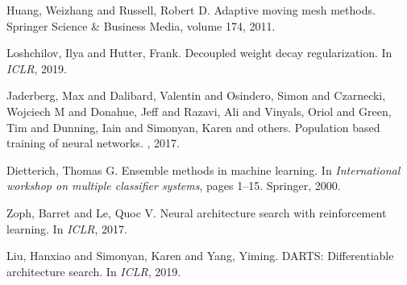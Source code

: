\documentclass[11pt,a4paper]{article}
\begin{document}
\begin{thebibliography}{15}
Huang, Weizhang and Russell, Robert D.
\newblock Adaptive moving mesh methods.
\newblock Springer Science \& Business Media, volume 174, 2011.

Loshchilov, Ilya and Hutter, Frank.
\newblock Decoupled weight decay regularization.
\newblock In {\em ICLR}, 2019.

Jaderberg, Max and Dalibard, Valentin and Osindero, Simon and Czarnecki, Wojciech M and Donahue, Jeff and Razavi, Ali and Vinyals, Oriol and Green, Tim and Dunning, Iain and Simonyan, Karen and others.
\newblock Population based training of neural networks.
, 2017.

Dietterich, Thomas G.
\newblock Ensemble methods in machine learning.
\newblock In {\em International workshop on multiple classifier systems}, pages 1--15. Springer, 2000.

Zoph, Barret and Le, Quoc V.
\newblock Neural architecture search with reinforcement learning.
\newblock In {\em ICLR}, 2017.

Liu, Hanxiao and Simonyan, Karen and Yang, Yiming.
\newblock DARTS: Differentiable architecture search.
\newblock In {\em ICLR}, 2019.

\end{thebibliography}
\end{document}
